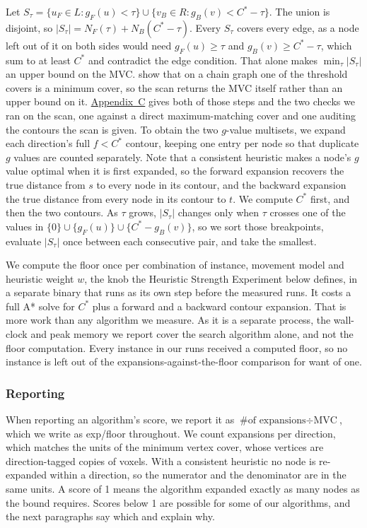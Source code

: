 \documentclass[letterpaper]{article} %
\begin{document}
Let $S_\tau = \{u_F \in L: g_F(u) < \tau\} \cup \{v_B \in R: g_B(v) < C^*-\tau\}$. The union is disjoint, so $|S_\tau| = N_F(\tau) + N_B(C^*-\tau)$. Every $S_\tau$ covers every edge, as a node left out of it on both sides would need $g_F(u)\ge\tau$ and $g_B(v)\ge C^*-\tau$, which sum to at least $C^*$ and contradict the edge condition. That alone makes $\min_\tau|S_\tau|$ an upper bound on the MVC. \citet{shaham2017minimal} show that on a chain graph one of the threshold covers is a minimum cover, so the scan returns the MVC itself rather than an upper bound on it. \hyperref[app:c]{Appendix~C} gives both of those steps and the two checks we ran on the scan, one against a direct maximum-matching cover and one auditing the contours the scan is given. To obtain the two $g$-value multisets, we expand each direction's full $f<C^*$ contour, keeping one entry per node so that duplicate $g$ values are counted separately. Note that a consistent heuristic makes a node's $g$ value optimal when it is first expanded, so the forward expansion recovers the true distance from $s$ to every node in its contour, and the backward expansion the true distance from every node in its contour to $t$. We compute $C^*$ first, and then the two contours. As $\tau$ grows, $|S_\tau|$ changes only when $\tau$ crosses one of the values in $\{0\} \cup \{g_F(u)\} \cup \{C^*-g_B(v)\}$, so we sort those breakpoints, evaluate $|S_\tau|$ once between each consecutive pair, and take the smallest.

We compute the floor once per combination of instance, movement model and heuristic weight $w$, the knob the Heuristic Strength Experiment below defines, in a separate binary that runs as its own step before the measured runs. It costs a full A* solve for $C^*$ plus a forward and a backward contour expansion. That is more work than any algorithm we measure. As it is a separate process, the wall-clock and peak memory we report cover the search algorithm alone, and not the floor computation. Every instance in our runs received a computed floor, so no instance is left out of the expansions-against-the-floor comparison for want of one.

\subsubsection{Reporting}
When reporting an algorithm's score, we report it as $\text{\# of expansions} \div \text{MVC}$, which we write as exp/floor throughout. We count expansions per direction, which matches the units of the minimum vertex cover, whose vertices are direction-tagged copies of voxels. With a consistent heuristic no node is re-expanded within a direction, so the numerator and the denominator are in the same units. A score of 1 means the algorithm expanded exactly as many nodes as the bound requires. Scores below 1 are possible for some of our algorithms, and the next paragraphs say which and explain why.
\end{document}
